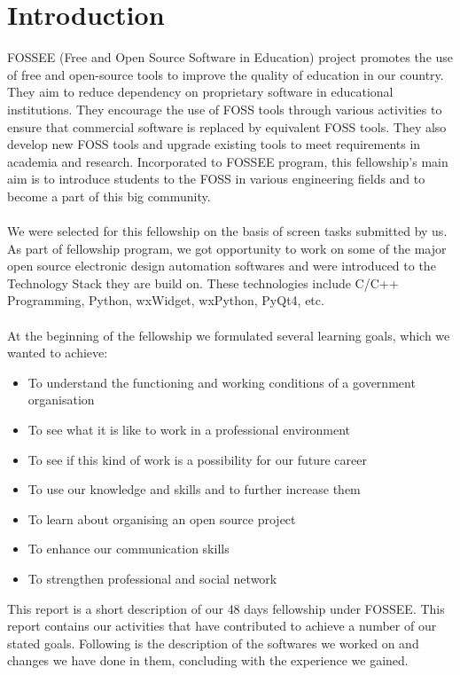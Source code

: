 \documentclass[12pt,a4paper]{report}
\begin{document}
\chapter{\textbf{Introduction}}
FOSSEE (Free and Open Source Software in Education) project promotes the use of free and open-source tools to improve the quality of education in our country. They aim to reduce dependency on proprietary software in educational institutions. They encourage the use of FOSS tools through various activities to ensure that commercial software is replaced by equivalent FOSS tools. They also develop new FOSS tools and upgrade existing tools to meet requirements in academia and research. 
Incorporated to FOSSEE program, this fellowship's main aim is to introduce students to the FOSS in various engineering fields and to become a part of this big community.
\\\\
We were selected for this fellowship on the basis of screen tasks submitted by us. As part of fellowship program, we got opportunity to work on some of the major open source electronic design automation softwares and were introduced to the Technology Stack they are build on. These technologies include C/C++ Programming, Python, wxWidget, wxPython, PyQt4, etc. 
\\\\
At the beginning of the fellowship we formulated several learning goals, which we wanted to achieve:
\begin{itemize}
	\item To understand the functioning and working conditions of a government organisation
	\item To see what it is like to work in a professional environment
	\item To see if this kind of work is a possibility for our future career
	\item To use our knowledge and skills and to further increase them
	\item To learn about organising an open source project
	\item To enhance our communication skills
	\item To strengthen professional and social network
\end{itemize}
This report is a short description of our 48 days fellowship under FOSSEE. This report contains our activities that have contributed to achieve a number of our stated goals. Following is the description of the softwares we worked on and changes we have done in them, concluding with the experience we gained.
\end{document}
